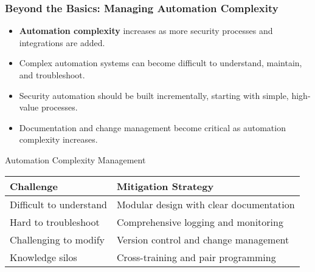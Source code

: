 \documentclass{beamer}
\begin{document}
\begin{frame}
  \frametitle{Beyond the Basics: Managing Automation Complexity}
  
  \begin{itemize}
    \item \textbf{Automation complexity} increases as more security processes and integrations are added.
    \item Complex automation systems can become difficult to understand, maintain, and troubleshoot.
    \item Security automation should be built incrementally, starting with simple, high-value processes.
    \item Documentation and change management become critical as automation complexity increases.
  \end{itemize}
  
  \begin{block}{Automation Complexity Management}
    \begin{tabular}{|l|l|}
      \hline
      \textbf{Challenge} & \textbf{Mitigation Strategy} \\
      \hline
      Difficult to understand & Modular design with clear documentation \\
      Hard to troubleshoot & Comprehensive logging and monitoring \\
      Challenging to modify & Version control and change management \\
      Knowledge silos & Cross-training and pair programming \\
      \hline
    \end{tabular}
  \end{block}
\end{frame}
\end{document}
